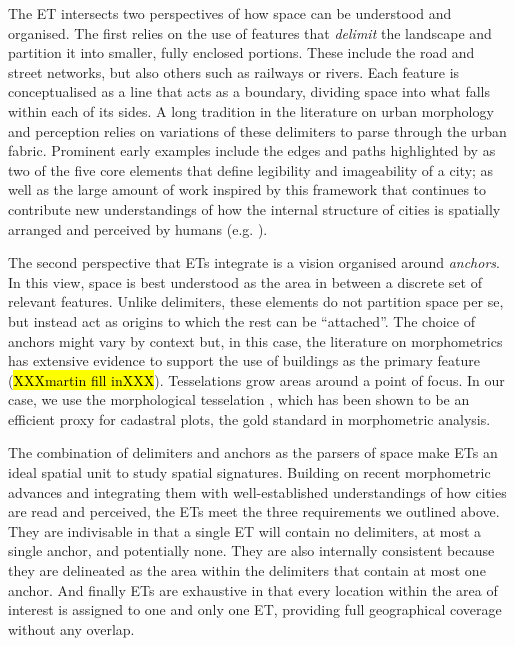 The ET intersects two perspectives of how space can be understood and organised.
%
The first relies on the use of features that \textit{delimit} the landscape
and partition it into smaller, fully enclosed portions. These include the
road and street networks, but also others such as railways or rivers. Each
feature is conceptualised as a line that acts as a boundary, dividing space
into what falls within each of its sides.
%
A long tradition in the literature on urban morphology and perception
relies on variations of these delimiters to parse through the urban
fabric. Prominent early examples include the edges and paths highlighted by
\cite{lynch1960} as two of the five core elements that define legibility and
imageability of a city; as well as the large amount of work inspired by this
framework that continues to contribute new understandings of how the internal
structure of cities is spatially arranged and perceived by humans (e.g.
\citealp{filomena2019a}).

The second perspective that ETs integrate is a vision organised
around \textit{anchors}. In this view, space is best understood as the area in
between a discrete set of relevant features. Unlike delimiters, these elements
do not partition space per se, but instead act as origins to which the rest
can be ``attached''.
%
The choice of anchors might vary by context but, in this case, the literature
on morphometrics has extensive evidence to support the use of buildings as
the primary feature (\hl{XXXmartin fill inXXX}).
%
Tesselations grow areas around a point of focus. In our case, we use the
morphological tesselation \citep{fleischmann2020morphological}, which has been
shown to be an efficient proxy for cadastral plots, the gold standard in
morphometric analysis.


The combination of delimiters and anchors as the parsers of space make ETs an
ideal spatial unit to study spatial signatures.
%
Building on recent morphometric advances and integrating them with
well-established understandings of how cities are read and perceived, the ETs
meet the three requirements we outlined above.
%
They are indivisable in that a single ET will contain no delimiters, at
most a single anchor, and potentially none.
%
They are also internally consistent because they are delineated as the area
within the delimiters that contain at most one anchor.
%
And finally ETs are exhaustive in that every location within the area of
interest is assigned to one and only one ET, providing full geographical
coverage without any overlap.

